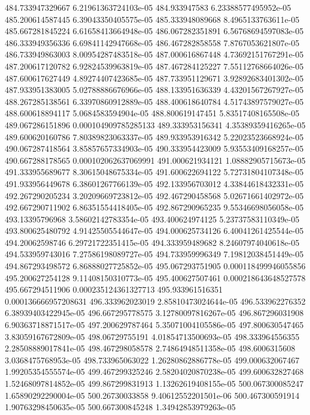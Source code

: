 {484.733947329667 6.21961363724103e-05
484.933947583 6.23388577495952e-05
485.200614587445 6.39043350405575e-05
485.333948089668 8.4965133763611e-05
485.667281845224 6.61658413664948e-05
486.067282351891 6.56768694597083e-05
486.333949356336 6.69841142947668e-05
486.467282858558 7.8767053621807e-05
486.733949863003 8.00954287483518e-05
487.000616867448 4.73692151767291e-05
487.200617120782 6.92824539963819e-05
487.467284125227 7.55112768664026e-05
487.600617627449 4.89274407423685e-05
487.733951129671 3.92892683401302e-05
487.933951383005 5.02788886676966e-05
488.133951636339 4.43201567267927e-05
488.267285138561 6.33970860912889e-05
488.400618640784 4.51743897579027e-05
488.600618894117 5.0684583594904e-05
488.800619147451 5.83517408165508e-05
489.067286151896 0.000104909785285133
489.333953156341 4.35389359416265e-05
489.600620160786 7.80389823063337e-05
489.933953916342 5.22023523668924e-05
490.067287418564 3.85857657334903e-05
490.333954423009 5.93553409168257e-05
490.667288178565 0.000102062637069991
491.000621934121 1.08882905715673e-05
491.333955689677 8.30615048675334e-05
491.600622694122 5.72731804107348e-05
491.933956449678 6.38601267766139e-05
492.133956703012 4.33844618432331e-05
492.267290205234 3.20209669723812e-05
492.467290458568 5.02671661402972e-05
492.667290711902 6.86351554418405e-05
492.867290965235 9.55346698056058e-05
493.13395796968 3.58602142783354e-05
493.400624974125 5.23737583110349e-05
493.800625480792 4.91425505544647e-05
494.000625734126 6.40041261425544e-05
494.20062598746 6.29721722351415e-05
494.333959489682 8.24607974040618e-05
494.533959743016 7.27586198089727e-05
494.733959996349 7.19812038451449e-05
494.867293498572 6.86888027725852e-05
495.067293751905 0.000118499946055856
495.200627254128 9.11408150310773e-05
495.400627507461 0.000218643648527578
495.667294511906 0.000235124361327713
495.933961516351 0.000136666957208631
496.333962023019 2.85810473024644e-05
496.533962276352 6.38939403422945e-05
496.667295778575 3.12780097816267e-05
496.867296031908 6.90363718871517e-05
497.200629787464 5.35071004105586e-05
497.800630547465 3.83059167672809e-05
498.06729755191 4.01854713500693e-05
498.333964556355 2.28508889017841e-05
498.467298058578 2.74864948511358e-05
498.6006315608 3.0368475768953e-05
498.733965063022 1.26280862886778e-05
499.000632067467 1.99205354555574e-05
499.467299325246 2.58204020870238e-05
499.600632827468 1.52468097814852e-05
499.867299831913 1.13262619408155e-05
500.067300085247 1.65890292290004e-05
500.26730033858 9.40612552201501e-06
500.467300591914 1.90763298450635e-05
500.667300845248 1.34942853979263e-05
}
